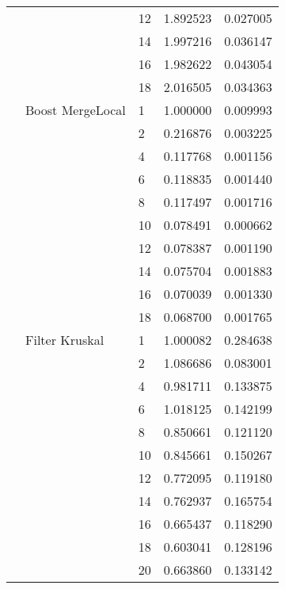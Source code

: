 \begin{tabular}{lllrr}
                      &            & 12 &  1.892523 &  0.027005 \\
                      &            & 14 &  1.997216 &  0.036147 \\
                      &            & 16 &  1.982622 &  0.043054 \\
                      &            & 18 &  2.016505 &  0.034363 \\
                      & Boost MergeLocal & 1  &  1.000000 &  0.009993 \\
                      &            & 2  &  0.216876 &  0.003225 \\
                      &            & 4  &  0.117768 &  0.001156 \\
                      &            & 6  &  0.118835 &  0.001440 \\
                      &            & 8  &  0.117497 &  0.001716 \\
                      &            & 10 &  0.078491 &  0.000662 \\
                      &            & 12 &  0.078387 &  0.001190 \\
                      &            & 14 &  0.075704 &  0.001883 \\
                      &            & 16 &  0.070039 &  0.001330 \\
                      &            & 18 &  0.068700 &  0.001765 \\
                      & Filter Kruskal & 1  &  1.000082 &  0.284638 \\
                      &            & 2  &  1.086686 &  0.083001 \\
                      &            & 4  &  0.981711 &  0.133875 \\
                      &            & 6  &  1.018125 &  0.142199 \\
                      &            & 8  &  0.850661 &  0.121120 \\
                      &            & 10 &  0.845661 &  0.150267 \\
                      &            & 12 &  0.772095 &  0.119180 \\
                      &            & 14 &  0.762937 &  0.165754 \\
                      &            & 16 &  0.665437 &  0.118290 \\
                      &            & 18 &  0.603041 &  0.128196 \\
                      &            & 20 &  0.663860 &  0.133142 \\

\end{tabular}
